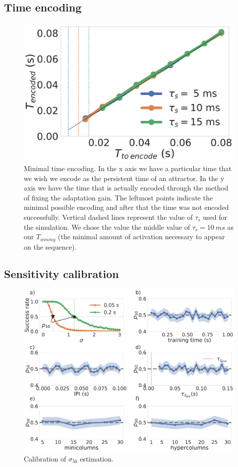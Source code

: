 \documentclass[10pt,a4paper]{article}
\begin{document}
\subsection{Time encoding}
\begin{figure}[H]
\centering
\includegraphics[scale=0.40]{time_encoding.pdf}
\caption{Minimal time encoding. In the x axis we have a particular time that we wish we encode as the persistent time of an attractor. In the y axis we have the time that is actually encoded through the method of fixing the adaptation gain. The leftmost points indicate the minimal possible encoding and after that the time was not encoded successfully. Vertical dashed lines represent the value of $\tau_s$ used for the simulation. We chose the value the middle value of $\tau_s=10 \: ms$  as our $T_{wining}$ (the minimal amount of activation necessary to appear on the sequence).}
\label{fig:min_time_encoding}
\end{figure}

\subsection{Sensitivity calibration}

\begin{figure}[H]
\centering
\includegraphics[scale=0.20]{noise_estimates.pdf}
\caption{Calibration of $\sigma_{50}$ estimation.}
\label{fig:noise_calibration}
\end{figure}
\end{document}
